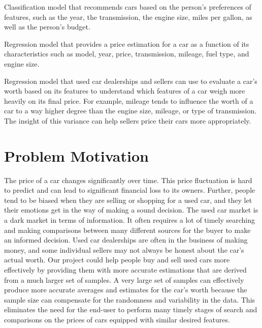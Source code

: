 \documentclass[12pt]{article}
\begin{document}
\begin{description}[font=$\bullet$~\normalfont\scshape\color{red!50!black}]
\item [For buyers:] Classification model that recommends cars based on the person's preferences of features, such as the year, the transmission, the engine size, miles per gallon, as well as the person's budget.
\item [For sellers:] Regression model that provides a price estimation for a car as a function of its characteristics such as model, year, price, transmission, mileage, fuel type, and engine size.
\item [Enterprises:] Regression model that used car dealerships and sellers can use to evaluate a car's worth based on its features to understand which features of a car weigh more heavily on its final price. For example, mileage tends to influence the worth of a car to a way higher degree than the engine size, mileage, or type of transmission. The insight of this variance can help sellers price their cars more appropriately.
\end{description}

\section{Problem Motivation}

The price of a car changes significantly over time. This price fluctuation is hard to predict and can lead to significant financial loss to its owners. Further, people tend to be biased when they are selling or shopping for a used car, and they let their emotions get in the way of making a sound decision. The used car market is a dark market in terms of information. It often requires a lot of timely searching and making comparisons between many different sources for the buyer to make an informed decision. Used car dealerships are often in the business of making money, and some individual sellers may not always be honest about the car's actual worth. Our project could help people buy and sell used cars more effectively by providing them with more accurate estimations that are derived from a much larger set of samples. A very large set of samples can effectively produce more accurate averages and estimates for the car's worth because the sample size can compensate for the randomness and variability in the data. This eliminates the need for the end-user to perform many timely stages of search and comparisons on the prices of cars equipped with similar desired features.
\end{document}
